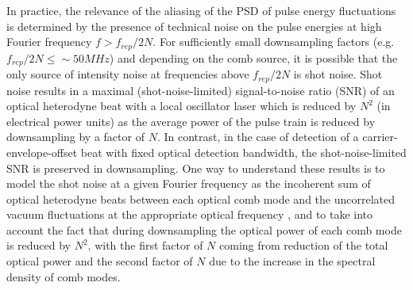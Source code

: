 In practice, the relevance of the aliasing of the PSD of pulse energy fluctuations is determined by the presence of technical noise on the pulse energies at high Fourier frequency $f > f_{rep}/2N$. For sufficiently small downsampling factors (e.g. $f_{rep}/2N\leq\sim50 MHz$) and depending on the comb source, it is possible that the only source of intensity noise at frequencies above $f_{rep}/2N$ is shot noise. Shot noise results in a maximal (shot-noise-limited) signal-to-noise ratio (SNR) of an optical heterodyne beat with a local oscillator laser which is reduced by $N^2$ (in electrical power units) as the average power of the pulse train is reduced by downsampling by a factor of $N$. In contrast, in the case of detection of a carrier-envelope-offset beat with fixed optical detection bandwidth, the shot-noise-limited SNR is preserved in downsampling. One way to understand these results is to model the shot noise at a given Fourier frequency as the incoherent sum of optical heterodyne beats between each optical comb mode and the uncorrelated vacuum fluctuations at the appropriate optical frequency \cite{Bachor1990,Quinlan2013}, and to take into account the fact that during downsampling the optical power of each comb mode is reduced by $N^2$, with the first factor of $N$ coming from reduction of the total optical power and the second factor of $N$ due to the increase in the spectral density of comb modes. 

